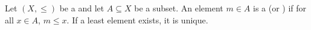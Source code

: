 \begin{definition} \label{definition:least_element_minimum_element_in_a_subset_of_a_partially_ordered_set}
Let $(X, \leq)$ be a  and let $A \subseteq X$ be a subset. 
An element $m \in A$ is a  (or ) if for all $x \in A$, $m \leq x$. If a least element exists, it is unique.
\end{definition}